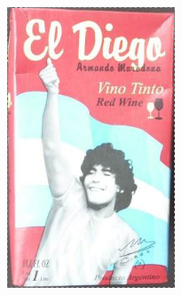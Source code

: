 \documentclass[10pt,landscape,twocolumn,a4paper,notitlepage]{article}
\begin{document}
\def\title{El Diego 2.0}
 


\begin{center}
\includegraphics[width=5cm]{fotodiego}
\end{center}
\tableofcontents
\newpage
 
\end{document}

